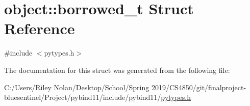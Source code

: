 \hypertarget{structobject_1_1borrowed__t}{}\section{object\+::borrowed\+\_\+t Struct Reference}
\label{structobject_1_1borrowed__t}


{\ttfamily \#include $<$pytypes.\+h$>$}



The documentation for this struct was generated from the following file\+:\begin{DoxyCompactItemize}
\item 
C\+:/\+Users/\+Riley Nolan/\+Desktop/\+School/\+Spring 2019/\+C\+S4850/git/finalproject-\/bluesentinel/\+Project/pybind11/include/pybind11/\mbox{\hyperlink{pytypes_8h}{pytypes.\+h}}\end{DoxyCompactItemize}

